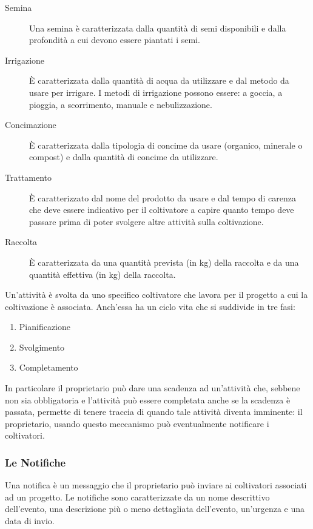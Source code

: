 \documentclass[12pt,a4paper]{article}
\begin{document}
\begin{description}
    \item[Semina] Una semina è caratterizzata dalla quantità di semi disponibili e dalla profondità a cui devono essere piantati i semi.
    
    \item[Irrigazione] È caratterizzata dalla quantità di acqua da utilizzare e dal metodo da usare per irrigare. I metodi di irrigazione possono essere: a goccia, a pioggia, a scorrimento, manuale e nebulizzazione.
    
    \item[Concimazione] È caratterizzata dalla tipologia di concime da usare (organico, minerale o compost) e dalla quantità di concime da utilizzare.
    
    \item[Trattamento] È caratterizzato dal nome del prodotto da usare e dal tempo di carenza che deve essere indicativo per il coltivatore a capire quanto tempo deve passare prima di poter svolgere altre attività sulla coltivazione.
    
    \item[Raccolta] È caratterizzata da una quantità prevista (in kg) della raccolta e da una quantità effettiva (in kg) della raccolta.
\end{description}

Un'attività è svolta da uno specifico coltivatore che lavora per il progetto a cui la coltivazione è associata. Anch'essa ha un ciclo vita che si suddivide in tre fasi:

\begin{enumerate}
    \item Pianificazione
    \item Svolgimento
    \item Completamento
\end{enumerate}

In particolare il proprietario può dare una scadenza ad un'attività che, sebbene non sia obbligatoria e l'attività può essere completata anche se la scadenza è passata, permette di tenere traccia di quando tale attività diventa imminente: il proprietario, usando questo meccanismo può eventualmente notificare i coltivatori.

\subsubsection{Le Notifiche}

Una notifica è un messaggio che il proprietario può inviare ai coltivatori associati ad un progetto. Le notifiche sono caratterizzate da un nome descrittivo dell'evento, una descrizione più o meno dettagliata dell'evento, un'urgenza e una data di invio.
\end{document}

